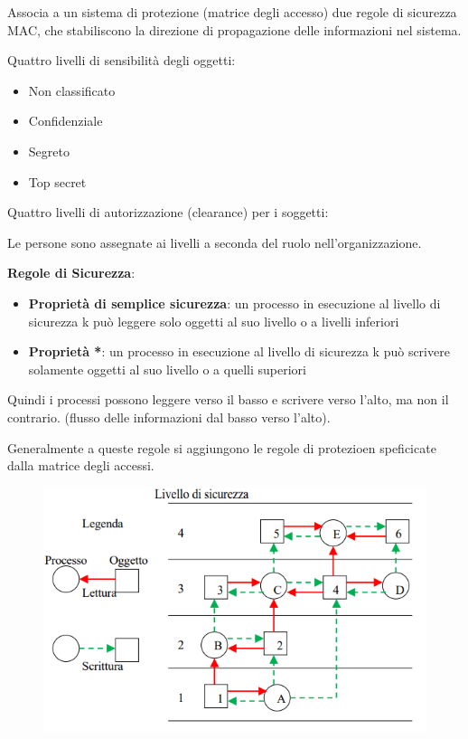 \documentclass{article}
\begin{document}
Associa a un sistema di protezione (matrice degli accesso) due regole di sicurezza MAC, che stabiliscono la direzione di propagazione delle informazioni nel sistema.

\vspace{3mm}
Quattro livelli di sensibilità degli oggetti:
\begin{itemize}
    \item Non classificato
    \item Confidenziale
    \item Segreto
    \item Top secret
\end{itemize}

\vspace{3mm}
Quattro livelli di autorizzazione (clearance) per i soggetti:

Le persone sono assegnate ai livelli a seconda del ruolo nell'organizzazione.

\vspace{3mm}
\textbf{Regole di Sicurezza}:
\begin{itemize}
    \item \textbf{Proprietà di semplice sicurezza}: un processo in esecuzione al livello di sicurezza k può leggere solo oggetti al suo livello o a livelli inferiori
    \item \textbf{Proprietà *}: un processo in esecuzione al livello di sicurezza k può scrivere solamente oggetti al suo livello o a quelli superiori
\end{itemize}

Quindi i processi possono leggere verso il basso e scrivere verso l'alto, ma non il contrario. (flusso delle informazioni dal basso verso l'alto).

\vspace{3mm}
Generalmente a queste regole si aggiungono le regole di protezioen speficicate dalla matrice degli accessi.

\begin{figure}[htbp]
    \centering
    \includegraphics[width=0.70\columnwidth]{imgs/bell-padula.PNG}
\end{figure}
\end{document}
